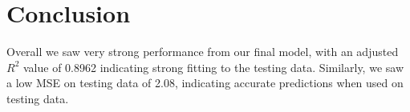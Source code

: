 \documentclass{article}
\begin{document}
\begin{comment}
\begin{table}[h]
    \centering
    \begin{tabular}{lcccc}
        \toprule
        Predictor  & Coefficient & Std. Error & t-value & p-value \\
        \midrule
        Intercept  & 2.4734      & 0.3584     & 6.902   & \textbf{1.24e-10} \\
        TV         & 0.0472      & 0.0016     & 29.931  & \textbf{$<$2e-16} \\
        Radio      & 0.1919      & 0.0097     & 19.819  & \textbf{$<$2e-16} \\
        \bottomrule
    \end{tabular}
\end{table}
\newpage
Comparing the two models, Model 2 outperforms Model 1 in terms of adjusted $R^2$, which increases from 0.8915 to 0.8921, suggesting a slightly better fit despite having one fewer predictor. Furthermore, the MSE values for the test set are 2.08497 for Model 1 and 2.08459 for Model 2, indicating an improvement in prediction accuracy. Since Model 2 achieves a marginally lower MSE and a higher adjusted $R^2$, we conclude that it is the superior model for predicting sales.

To ensure the validity of our model, we conducted a Durbin-Watson test to check for autocorrelation in the residuals. The test resulted in a Durbin-Watson statistic of 1.8874 with a p-value of 0.2385. Since the p-value is not significant, we fail to reject the null hypothesis, meaning that there is no significant autocorrelation in the residuals. This confirms the reliability of Model 2.

Additionally, a residual analysis was performed to verify model assumptions. The histogram and Q-Q plot of residuals suggest that they are approximately normally distributed, with slight deviations. The residuals versus fitted values plot does not indicate clear heteroscedasticity, implying that variance remains fairly constant across predictions. Furthermore, Cook’s Distance test identified several high-leverage points, including indices 3, 6, 26, 36, 76, 77, 92, 118, 127, 131, and 179. However, their influence on the model was minor, and thus they were not removed.
\end{comment}

\section{Conclusion}
Overall we saw very strong performance from our final model, with an adjusted $R^2$ value of 0.8962 indicating strong fitting to the testing data. Similarly, we saw a low MSE on testing data of 2.08, indicating accurate predictions when used on testing data. 
\end{document}
